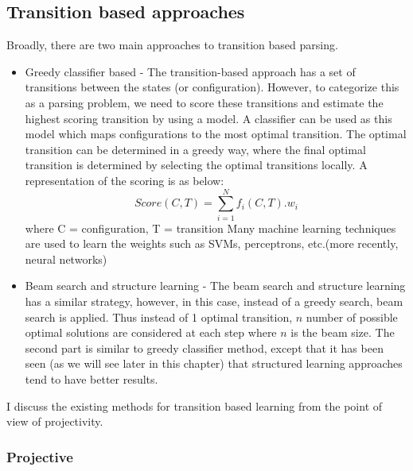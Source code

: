 \subsection{Transition based approaches}

Broadly, there are two main approaches to transition based parsing. 

\begin{itemize}
\item Greedy classifier based - The transition-based approach has a set of transitions between the states (or configuration). However, to categorize this as a parsing problem, we need to score these transitions and estimate the highest scoring transition by using a model. A classifier can be used as this model which maps configurations to the most optimal transition. The optimal transition can be determined in a greedy way, where the final optimal transition is determined by selecting the optimal transitions locally. A representation of the scoring is as below:
\begin{equation*}
Score(C, T) = \sum_{i = 1}^{N} f_i(C,T).w_i
\end{equation*}
where C = configuration, T = transition
Many machine learning techniques are used to learn the weights such as SVMs, perceptrons, etc.(more recently, neural networks)

\item Beam search and structure learning - The beam search and structure learning has a similar strategy, however, in this case, instead of a greedy search, beam search is applied. Thus instead of 1 optimal transition, $n$ number of possible optimal solutions are considered at each step where $n$ is the beam size. The second part is similar to greedy classifier method, except that it has been seen (as we will see later in this chapter) that structured learning approaches tend to have better results.
\end{itemize}

I discuss the existing methods for transition based learning from the point of view of projectivity. %

\subsubsection{Projective}

